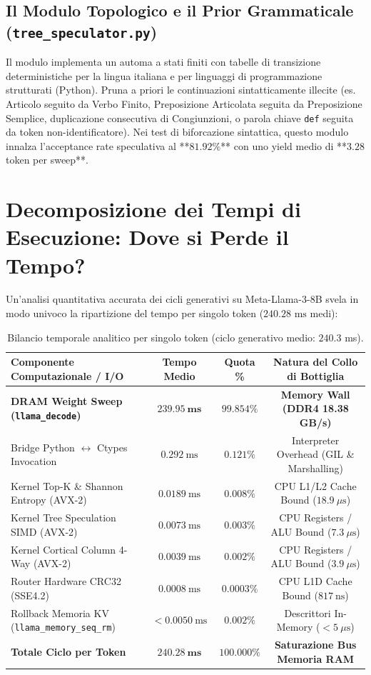 \documentclass[10pt,a4paper]{article}
\theoremstyle{definition}
\begin{document}
\subsection{Il Modulo Topologico e il Prior Grammaticale (\texttt{tree\_speculator.py})}
Il modulo implementa un automa a stati finiti con tabelle di transizione deterministiche per la lingua italiana e per linguaggi di programmazione strutturati (Python). Pruna a priori le continuazioni sintatticamente illecite (es. Articolo seguito da Verbo Finito, Preposizione Articolata seguita da Preposizione Semplice, duplicazione consecutiva di Congiunzioni, o parola chiave \texttt{def} seguita da token non-identificatore). 
Nei test di biforcazione sintattica, questo modulo innalza l'acceptance rate speculativa al **$81.92\%$** con uno yield medio di **$3.28$ token per sweep**.

\bigskip

\section{Decomposizione dei Tempi di Esecuzione: Dove si Perde il Tempo?}

Un'analisi quantitativa accurata dei cicli generativi su Meta-Llama-3-8B svela in modo univoco la ripartizione del tempo per singolo token ($240.28\text{ ms}$ medi):

\begin{table}[htbp]
\centering
\small
\caption{Bilancio temporale analitico per singolo token (ciclo generativo medio: $240.3$ ms).}
\label{tab:time_breakdown}
\begin{tabular}{lccc}
\toprule
\textbf{Componente Computazionale / I/O} & \textbf{Tempo Medio} & \textbf{Quota \%} & \textbf{Natura del Collo di Bottiglia} \\
\midrule
\textbf{DRAM Weight Sweep (\texttt{llama\_decode})} & $\mathbf{239.95\ \text{ms}}$ & $\mathbf{99.854\%}$ & \textbf{Memory Wall (DDR4 18.38 GB/s)} \\
Bridge Python $\leftrightarrow$ Ctypes Invocation & $0.292\ \text{ms}$ & $0.121\%$ & Interpreter Overhead (GIL \& Marshalling) \\
Kernel Top-K \& Shannon Entropy (AVX-2) & $0.0189\ \text{ms}$ & $0.008\%$ & CPU L1/L2 Cache Bound ($18.9\ \mu\text{s}$) \\
Kernel Tree Speculation SIMD (AVX-2) & $0.0073\ \text{ms}$ & $0.003\%$ & CPU Registers / ALU Bound ($7.3\ \mu\text{s}$) \\
Kernel Cortical Column 4-Way (AVX-2) & $0.0039\ \text{ms}$ & $0.002\%$ & CPU Registers / ALU Bound ($3.9\ \mu\text{s}$) \\
Router Hardware CRC32 (SSE4.2) & $0.0008\ \text{ms}$ & $0.0003\%$ & CPU L1D Cache Bound ($817\ \text{ns}$) \\
Rollback Memoria KV (\texttt{llama\_memory\_seq\_rm}) & $< 0.0050\ \text{ms}$ & $0.002\%$ & Descrittori In-Memory ($< 5\ \mu\text{s}$) \\
\midrule
\textbf{Totale Ciclo per Token} & $\mathbf{240.28\ \text{ms}}$ & $\mathbf{100.000\%}$ & \textbf{Saturazione Bus Memoria RAM} \\
\bottomrule
\end{tabular}
\end{table}
\end{document}
